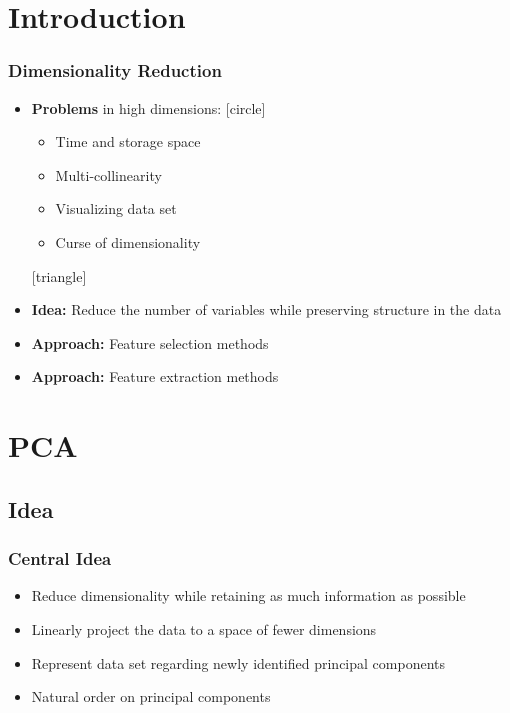 \documentclass{beamer}
\theoremstyle{plain}
\theoremstyle{definition}
\begin{document}
\section{Introduction} 
\begin{frame}
\frametitle{Dimensionality Reduction} 

\begin{itemize}
\item \textbf{Problems} in high dimensions: 
[circle]
	\begin{itemize}
	\item Time and storage space
	\item Multi-collinearity 
	\item Visualizing data set
	\item Curse of dimensionality
	\end{itemize}
[triangle]
\item \textbf{Idea:} Reduce the number of variables while preserving structure in the data
\item \textbf{Approach:} Feature selection methods
\item \textbf{Approach:} Feature extraction methods

\end{itemize}
\end{frame}


\section{PCA} 
\subsection{Idea}
\begin{frame}\frametitle{Central Idea}
\begin{itemize}
\item Reduce dimensionality while retaining as much information as possible
\item Linearly project the data to a space of fewer dimensions
\item Represent data set regarding newly identified principal components
\item Natural order on principal components
\end{itemize} 
\end{frame}
\end{document}
